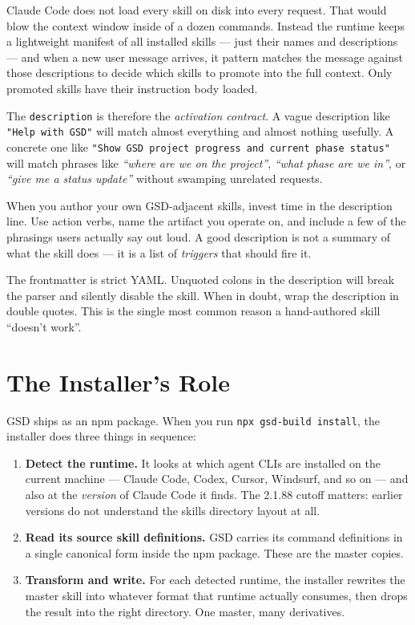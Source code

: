 \documentclass[11pt,letterpaper,openany]{book}
\begin{document}
Claude Code does not load every skill on disk into every request. That
would blow the context window inside of a dozen commands. Instead the
runtime keeps a lightweight manifest of all installed skills --- just their
names and descriptions --- and when a new user message arrives, it pattern
matches the message against those descriptions to decide which skills to
promote into the full context. Only promoted skills have their
instruction body loaded.

The \texttt{description} is therefore the \emph{activation contract}. A
vague description like \texttt{"Help with GSD"} will match almost
everything and almost nothing usefully. A concrete one like
\texttt{"Show GSD project progress and current phase status"} will match
phrases like \textit{``where are we on the project''},
\textit{``what phase are we in''}, or \textit{``give me a status update''}
without swamping unrelated requests.

When you author your own GSD-adjacent skills, invest time in the
description line. Use action verbs, name the artifact you operate on, and
include a few of the phrasings users actually say out loud. A good
description is not a summary of what the skill does --- it is a list of
\emph{triggers} that should fire it.

\begin{gsdnote}
The frontmatter is strict YAML. Unquoted colons in the description will
break the parser and silently disable the skill. When in doubt, wrap the
description in double quotes. This is the single most common reason a
hand-authored skill ``doesn't work''.
\end{gsdnote}

\section{The Installer's Role}

GSD ships as an npm package. When you run \texttt{npx gsd-build install},
the installer does three things in sequence:

\begin{enumerate}
\item \textbf{Detect the runtime.} It looks at which agent CLIs are
installed on the current machine --- Claude Code, Codex, Cursor, Windsurf,
and so on --- and also at the \emph{version} of Claude Code it finds. The
2.1.88 cutoff matters: earlier versions do not understand the skills
directory layout at all.
\item \textbf{Read its source skill definitions.} GSD carries its command
definitions in a single canonical form inside the npm package. These are
the master copies.
\item \textbf{Transform and write.} For each detected runtime, the
installer rewrites the master skill into whatever format that runtime
actually consumes, then drops the result into the right directory. One
master, many derivatives.
\end{enumerate}
\end{document}
